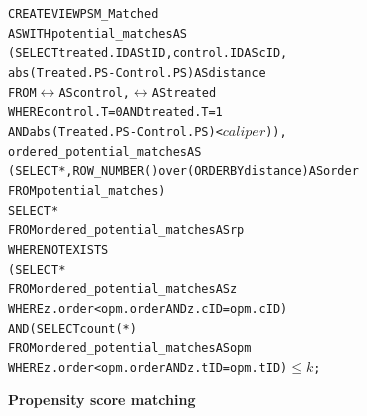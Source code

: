 \begin{figure}
  \centering
\begin{alltt} \scriptsize
CREATE VIEW PSM_Matched
AS WITH potential_matches AS
  (SELECT treated.ID AS tID, control.ID AS cID,
          abs(Treated.PS-Control.PS)  AS distance
   FROM \(\rel\) AS control, \(\rel\) AS treated
   WHERE control.T=0 AND treated.T=1
     AND abs(Treated.PS-Control.PS) < \(caliper\))),
            ordered_potential_matches AS
  (SELECT *, ROW_NUMBER() over (ORDER BY distance) AS order
   FROM potential_matches)
SELECT *
FROM ordered_potential_matches AS rp
WHERE NOT EXISTS
    (SELECT *
     FROM ordered_potential_matches AS z
     WHERE z.order < opm.order AND z.cID=opm.cID)
  AND (SELECT count(*)
     FROM ordered_potential_matches AS opm
     WHERE z.order < opm.order AND z.tID=opm.tID)\( \leq k\);
\end{alltt} \vspace{-.3cm}
  \caption{\bf Propensity score matching}\label{fig:nnmnr}
\end{figure}


